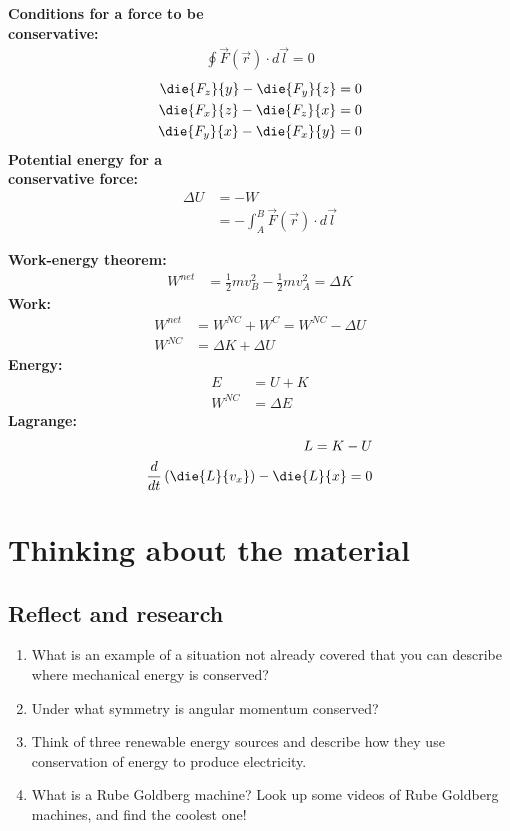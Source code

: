 \newpage
\begin{importantEquations}
\begin{multicols}{2}
\textbf{Conditions for a force to be\\ conservative:}
\begin{align*}
\oint \vec F(\vec r) \cdot d\vec l = 0
\end{align*}
\begin{align*}
\die{F_z}{y}-\die{F_y}{z} &= 0 \nonumber\\
\die{F_x}{z}-\die{F_z}{x} &= 0\nonumber\\
\die{F_y}{x}-\die{F_x}{y} &= 0
\end{align*}
\textbf{Potential energy for a\\ conservative force:}
\begin{align*}
\Delta U&=-W\\
&= - \int_A^B \vec F(\vec r) \cdot d\vec l
\end{align*}
\columnbreak

\textbf{Work-energy theorem:}
\begin{align*}
W^{net}&=\frac{1}{2}mv_B^2-\frac{1}{2}mv_A^2=\Delta K
\end{align*}
\textbf{Work:}
\begin{align*}
W^{net}&=W^{NC}+W^{C}=W^{NC}-\Delta U\\
W^{NC}&=\Delta K+\Delta U
\end{align*}
\textbf{Energy:}
\begin{align*}
E&=U+K\\
W^{NC}&=\Delta E
\end{align*}
\textbf{Lagrange:}
\begin{align*}
L = K - U\\
\frac{d}{dt}\left(\die{L}{v_x}\right)-\die{L}{x} = 0
\end{align*}
\end{multicols}
\end{importantEquations}


\newpage
\section{Thinking about the material}
\subsection{Reflect and research}

\begin{enumerate}
\item What is an example of a situation not already covered that you can describe where mechanical energy is conserved?
\item Under what symmetry is angular momentum conserved?
\item Think of three renewable energy sources and describe how they use conservation of energy to produce electricity. 
\item What is a Rube Goldberg machine? Look up some videos of Rube Goldberg machines, and find the coolest one!
\end{enumerate}
